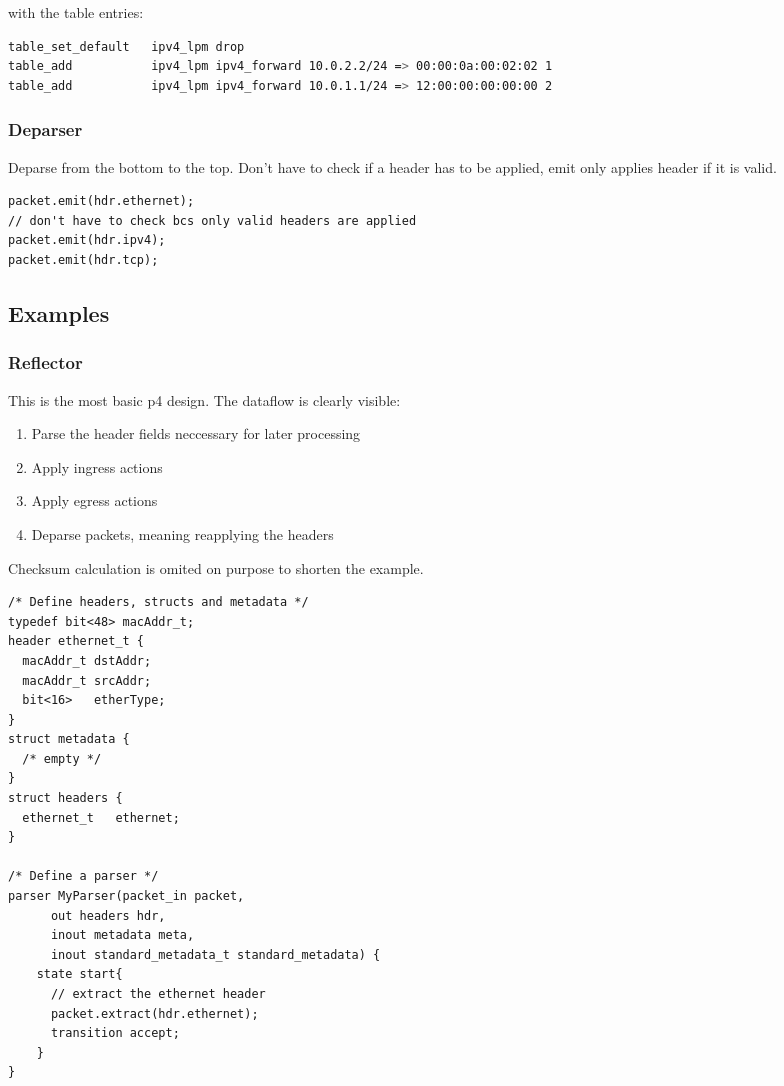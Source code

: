 \documentclass[a4paper, fontsize=8pt, landscape, DIV=1]{scrartcl}
\begin{document}
\begin{multicols*}{3}
with the table entries:
\begin{lstlisting}[language=bash]
table_set_default   ipv4_lpm drop
table_add           ipv4_lpm ipv4_forward 10.0.2.2/24 => 00:00:0a:00:02:02 1
table_add           ipv4_lpm ipv4_forward 10.0.1.1/24 => 12:00:00:00:00:00 2\end{lstlisting}

  \subsubsection{Deparser}
  Deparse from the bottom to the top. Don’t have to check if a header has to be applied, emit only applies header if it is valid.
  \begin{lstlisting}[style=P4style]
packet.emit(hdr.ethernet);
// don't have to check bcs only valid headers are applied
packet.emit(hdr.ipv4);
packet.emit(hdr.tcp);\end{lstlisting}

  \subsection{Examples}

  \subsubsection{Reflector}
  This is the most basic p4 design. The dataflow is clearly visible:

  \begin{enumerate}
    \item Parse the header fields neccessary for later processing
    \item Apply ingress actions
    \item Apply egress actions
    \item Deparse packets, meaning reapplying the headers
  \end{enumerate}

  Checksum calculation is omited on purpose to shorten the example.

  \begin{lstlisting}[style=P4style]
/* Define headers, structs and metadata */
typedef bit<48> macAddr_t;
header ethernet_t {
  macAddr_t dstAddr;
  macAddr_t srcAddr;
  bit<16>   etherType;
}
struct metadata {
  /* empty */
}
struct headers {
  ethernet_t   ethernet;
}

/* Define a parser */
parser MyParser(packet_in packet,
      out headers hdr,
      inout metadata meta,
      inout standard_metadata_t standard_metadata) {
    state start{
      // extract the ethernet header
      packet.extract(hdr.ethernet);
      transition accept;
    }
}


\end{lstlisting}
\end{multicols*}
\end{document}
